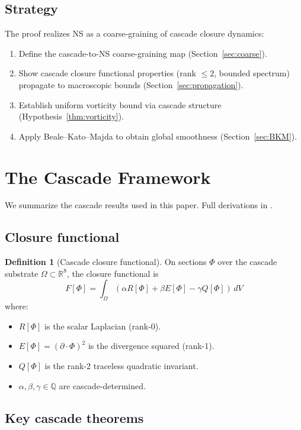\documentclass[11pt, a4paper]{amsart}
\theoremstyle{definition}
\newtheorem{definition}[theorem]{Definition}
\newcommand{\R}{\mathbb{R}}
\newcommand{\Q}{\mathbb{Q}}
\begin{document}
\subsection{Strategy}

The proof realizes NS as a coarse-graining of cascade closure
dynamics:
\begin{enumerate}
\item Define the cascade-to-NS coarse-graining map (Section~\ref{sec:coarse}).
\item Show cascade closure functional properties (rank $\leq 2$,
bounded spectrum) propagate to macroscopic bounds (Section~\ref{sec:propagation}).
\item Establish uniform vorticity bound via cascade structure
(Hypothesis~\ref{thm:vorticity}).
\item Apply Beale--Kato--Majda to obtain global smoothness
(Section~\ref{sec:BKM}).
\end{enumerate}

\section{The Cascade Framework}\label{sec:cascade}

We summarize the cascade results used in this paper. Full derivations
in \cite{CascadeFoundations}.

\subsection{Closure functional}

\begin{definition}[Cascade closure functional]\label{def:F}
On sections $\Phi$ over the cascade substrate $\Omega \subset \R^8$,
the closure functional is
\[
F[\Phi] = \int_\Omega (\alpha R[\Phi] + \beta E[\Phi] - \gamma Q[\Phi]) \, dV
\]
where:
\begin{itemize}
\item $R[\Phi]$ is the scalar Laplacian (rank-0).
\item $E[\Phi] = (\partial \cdot \Phi)^2$ is the divergence squared (rank-1).
\item $Q[\Phi]$ is the rank-2 traceless quadratic invariant.
\item $\alpha, \beta, \gamma \in \Q$ are cascade-determined.
\end{itemize}
\end{definition}

\subsection{Key cascade theorems}
\end{document}
